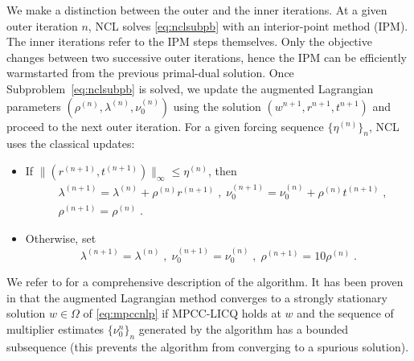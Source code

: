 \documentclass{IEEEtran4PSCC}
\newcommand{\add}[1]{#1}
\begin{document}
\add{We make a distinction between the {outer} and the {inner} iterations.
At a given outer iteration $n$, NCL solves \eqref{eq:nclsubpb}
with an interior-point method (IPM). The inner iterations refer to the IPM steps themselves.}
Only the objective changes between two successive outer iterations, hence the IPM
can be efficiently warmstarted from the previous primal-dual solution.
Once Subproblem~\eqref{eq:nclsubpb} is solved, we update the augmented Lagrangian
parameters $(\rho^{(n)}, \lambda^{(n)}, \nu_0^{(n)})$ using the solution $(w^{n+1}, r^{n+1}, t^{n+1})$
and proceed to the next outer iteration.
\add{For a given forcing sequence $\{\eta^{(n)}\}_n$, NCL uses the classical updates:
\begin{itemize}
  \item If $\|(r^{(n+1)}, t^{(n+1)})\|_\infty \leq \eta^{(n)}$, then
    \begin{equation*}
      \begin{aligned}
      & \lambda^{(n+1)} = \lambda^{(n)} + \rho^{(n)} r^{(n+1)} \; ,\;
        \nu_0^{(n+1)} = \nu_0^{(n)} + \rho^{(n)} t^{(n+1)} \; , \\
      & \rho^{(n+1)} = \rho^{(n)} \; .
      \end{aligned}
    \end{equation*}
  \item Otherwise, set
    \begin{equation*}
      \lambda^{(n+1)} = \lambda^{(n)} \; , \;
      \nu_0^{(n+1)} = \nu_0^{(n)} \; , \;
      \rho^{(n+1)} = 10 \rho^{(n)} \; .
    \end{equation*}
\end{itemize}}
We refer to \cite{montoison2025madncl} for a comprehensive description of the algorithm.
It has been proven in \cite{izmailov2012global} that the augmented Lagrangian
method converges to a strongly stationary solution $w \in \Omega$ of \eqref{eq:mpccnlp}
if MPCC-LICQ holds at $w$
and the sequence of multiplier estimates $\{\nu_0^n\}_n$ generated by the algorithm
has a bounded subsequence (this prevents the algorithm from converging to a spurious solution).
\end{document}
